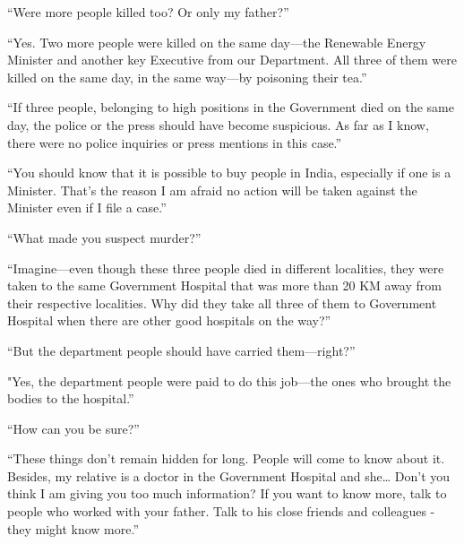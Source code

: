 “Were more people killed too? Or only my father?”

“Yes. Two more people were killed on the same day—the Renewable Energy
Minister and another key Executive from our Department. All three of them were
killed on the same day, in the same way—by poisoning their tea.”

“If three people, belonging to high positions in the Government died on the same
day, the police or the press should have become suspicious. As far as I know,
there were no police inquiries or press mentions in this case.”

“You should know that it is possible to buy people in India, especially if one
is a Minister. That's the reason I am afraid no action will be taken against the
Minister even if I file a case.”

“What made you suspect murder?”

“Imagine—even though these three people died in different localities, they
were taken to the same Government Hospital that was more than 20 KM away from
their respective localities. Why did they take all three of them to Government
Hospital when there are other good hospitals on the way?”

“But the department people should have carried them—right?”

"Yes, the department people were paid to do this job—the ones who brought the
bodies to the hospital.”

“How can you be sure?”

“These things don't remain hidden for long. People will come to know about it.
Besides, my relative is a doctor in the Government Hospital and she… Don't
you think I am giving you too much information? If you want to know more, talk
to people who worked with your father. Talk to his close friends and colleagues
- they might know more.”